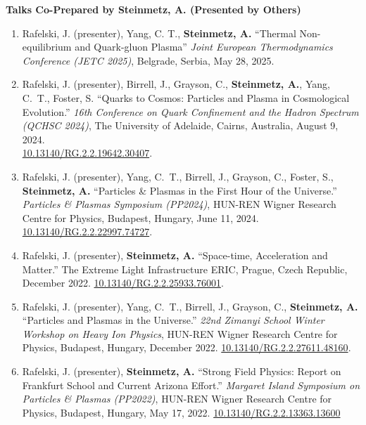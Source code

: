 \documentclass[11pt]{article}
\begin{document}
{\large\textbf{Talks Co-Prepared by Steinmetz, A. (Presented by Others)}}

\begin{enumerate}[leftmargin=*,nosep]
    \item Rafelski, J. (presenter), Yang, C. T., \textbf{Steinmetz, A.} ``Thermal Non-equilibrium and Quark-gluon Plasma'' \textit{Joint European Thermodynamics Conference (JETC 2025)}, Belgrade, Serbia, May 28, 2025.
    \item Rafelski, J. (presenter), Birrell, J., Grayson, C., \textbf{Steinmetz, A.}, Yang, C.~T., Foster, S. ``Quarks to Cosmos: Particles and Plasma in Cosmological Evolution.'' \textit{16th Conference on Quark Confinement and the Hadron Spectrum (QCHSC 2024)}, The University of Adelaide, Cairns, Australia, August 9, 2024.\\ \href{http://dx.doi.org/10.13140/RG.2.2.19642.30407}{10.13140/RG.2.2.19642.30407}.
    \item Rafelski, J. (presenter), Yang, C.~T., Birrell, J., Grayson, C., Foster, S., \textbf{Steinmetz, A.} ``Particles \& Plasmas in the First Hour of the Universe.'' \textit{Particles \& Plasmas Symposium (PP2024)}, HUN-REN Wigner Research Centre for Physics, Budapest, Hungary, June 11, 2024. \href{http://dx.doi.org/10.13140/RG.2.2.22997.74727}{10.13140/RG.2.2.22997.74727}.
    \item Rafelski, J. (presenter), \textbf{Steinmetz, A.} ``Space-time, Acceleration and Matter.'' The Extreme Light Infrastructure ERIC, Prague, Czech Republic, December 2022. \href{http://dx.doi.org/10.13140/RG.2.2.25933.76001}{10.13140/RG.2.2.25933.76001}.
    \item Rafelski, J. (presenter), Yang, C.~T., Birrell, J., Grayson, C., \textbf{Steinmetz, A.} ``Particles and Plasmas in the Universe.'' \textit{22nd Zimanyi School Winter Workshop on Heavy Ion Physics}, HUN-REN Wigner Research Centre for Physics, Budapest, Hungary, December 2022. \href{http://dx.doi.org/10.13140/RG.2.2.27611.48160}{10.13140/RG.2.2.27611.48160}.
    \item Rafelski, J. (presenter), \textbf{Steinmetz, A.} ``Strong Field Physics: Report on Frankfurt School and Current Arizona Effort.'' \textit{Margaret Island Symposium on Particles \& Plasmas (PP2022)}, HUN-REN Wigner Research Centre for Physics, Budapest, Hungary, May 17, 2022. \href{http://dx.doi.org/10.13140/RG.2.2.13363.13600}{10.13140/RG.2.2.13363.13600}
\end{enumerate}
\end{document}
